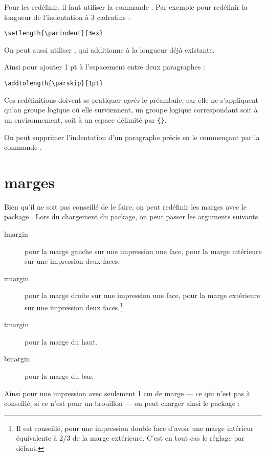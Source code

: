 Pour les redéfinir, il faut utiliser la commande . Par exemple pour redéfinir la longueur de l'indentation à 3 cadratins :
\begin{verbatim}
\setlength{\parindent}{3ex}
\end{verbatim}

On peut aussi utiliser , qui additionne  à la longueur déjà existante.

Ainsi pour ajouter 1 pt à l'espacement entre deux paragraphes :

\begin{verbatim}
\addtolength{\parskip}{1pt}
\end{verbatim}

Ces redéfinitions doivent se pratiquer \emph{après} le préambule, car elle ne s'appliquent qu'au groupe logique où elle surviennent, un groupe logique correspondant soit à un environnement, soit à un espace délimité par \verb|{}|.

\begin{anedocte}
On peut supprimer l'indentation d'un paragraphe précis en le commençant par la commande .
\end{anedocte}
\section{marges}

Bien qu'il ne soit pas conseillé de le faire, on peut redéfinir les marges avec le package . Lors du chargement du package, on peut passer les arguments suivants
\begin{description}
\item[lmargin]pour la marge gauche sur une impression une face, pour la marge intérieure sur une impression deux faces.
\item[rmargin]pour la marge droite sur une impression une face, pour la marge extérieure sur une impression deux faces.\footnote{Il est conseillé, pour une impression double face d'avoir une marge intérieur équivalente à 2/3 de la marge extérieure. C'est en tout cas le réglage par défaut.}
\item[tmargin]pour la marge du haut.
\item[bmargin]pour la marge du bas.
\end{description}

Ainsi pour une impression avec seulement 1 cm de marge --- ce qui n'est pas à conseillé, si ce n'est pour un brouillon --- on peut charger ainsi le package :

